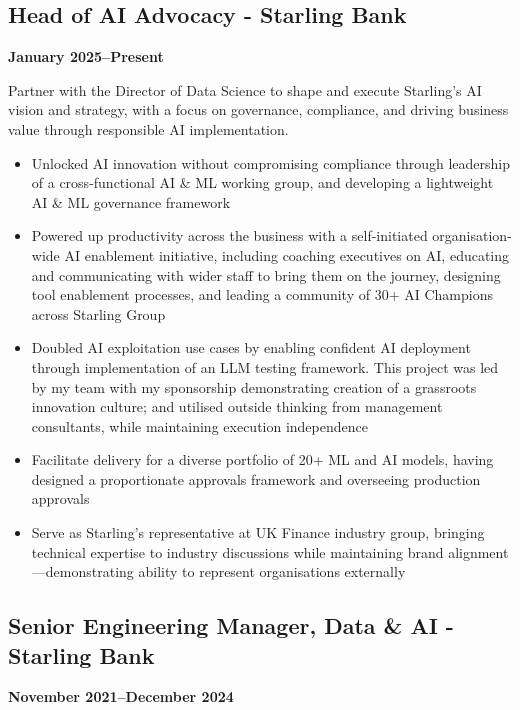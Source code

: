 \documentclass[a4paper]{scrartcl}
\begin{document}
\subsection*{Head of AI Advocacy - Starling Bank}
\textbf{January 2025--Present}

Partner with the Director of Data Science to shape and execute Starling's AI vision and strategy, with a focus on governance, compliance, and driving business value through responsible AI implementation.
\begin{itemize}
	\item Unlocked AI innovation without compromising compliance through leadership of a cross-functional AI \& ML working group, and developing a lightweight AI \& ML governance framework
	\item Powered up productivity across the business with a self-initiated organisation-wide AI enablement initiative, including coaching executives on AI, educating and communicating with wider staff to bring them on the journey, designing tool enablement processes, and leading a community of 30+ AI Champions across Starling Group
	\item Doubled AI exploitation use cases by enabling confident AI deployment through implementation of an LLM testing framework. This project was led by my team with my sponsorship demonstrating creation of a grassroots innovation culture; and utilised outside thinking from management consultants, while maintaining execution independence
	\item Facilitate delivery for a diverse portfolio of 20+ ML and AI models, having designed a proportionate approvals framework and overseeing production approvals
	\item Serve as Starling's representative at UK Finance industry group, bringing technical expertise to industry discussions while maintaining brand alignment—demonstrating ability to represent organisations externally
\end{itemize}

\subsection*{Senior Engineering Manager, Data \& AI - Starling Bank}
\textbf{November 2021--December 2024}
\end{document}
